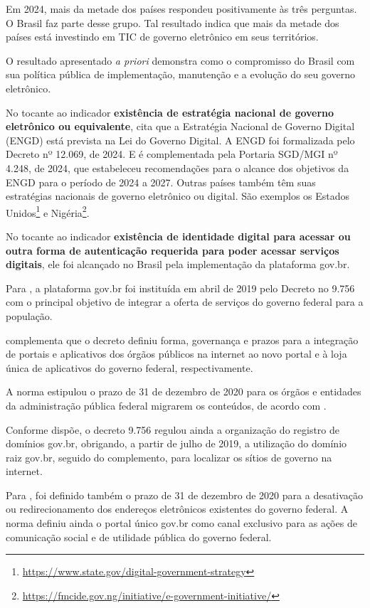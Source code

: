 Em 2024, mais da metade dos países respondeu positivamente às três perguntas. O Brasil faz parte desse grupo. Tal resultado indica que mais da metade dos países está investindo em TIC de governo eletrônico em seus territórios.

O resultado apresentado \textit{a priori} demonstra como o compromisso do Brasil com sua política pública de implementação, manutenção e a evolução do seu governo eletrônico.

No tocante ao indicador \textbf{existência de estratégia nacional de governo
eletrônico ou equivalente}, \cite{brasil_engd} cita que a Estratégia Nacional de Governo Digital (ENGD) está prevista na Lei do Governo Digital. A ENGD foi formalizada pelo Decreto nº 12.069, de 2024. E é complementada pela Portaria SGD/MGI nº 4.248, de 2024, que estabeleceu recomendações para o alcance dos objetivos da ENGD para o período de 2024 a 2027. Outras países também têm suas estratégias nacionais de governo eletrônico ou digital. São exemplos os Estados Unidos\footnote{\url{https://www.state.gov/digital-government-strategy}} e Nigéria\footnote{\url{https://fmcide.gov.ng/initiative/e-government-initiative/}}.

No tocante ao indicador \textbf{existência de identidade digital para acessar
ou outra forma de autenticação requerida para poder acessar serviços digitais}, ele foi alcançado no Brasil pela implementação da plataforma gov.br. 

Para \cite{mitkiewicz2024transformaccao}, a plataforma gov.br foi instituída em abril de 2019 pelo Decreto no 9.756 com o principal objetivo de integrar a oferta de serviços do governo federal para a população. 

\cite{mitkiewicz2024transformaccao} complementa que o decreto definiu forma, governança e prazos para a integração de portais e aplicativos dos órgãos públicos na internet ao novo portal e à loja única de aplicativos do governo federal, respectivamente. 

A norma estipulou o prazo de 31 de dezembro de 2020 para os órgãos e entidades da administração pública federal migrarem os conteúdos, de acordo com \cite{mitkiewicz2024transformaccao}.

Conforme \cite{mitkiewicz2024transformaccao} dispõe, o decreto 9.756 regulou ainda a organização do registro de domínios gov.br, obrigando, a partir de julho de 2019, a utilização do domínio raiz gov.br, seguido do complemento, para localizar os sítios de governo na internet. 

Para \cite{mitkiewicz2024transformaccao}, foi definido também o prazo de 31 de dezembro de 2020 para a desativação ou redirecionamento dos endereços eletrônicos existentes do governo federal. A norma definiu ainda o portal único gov.br como canal exclusivo para as ações de comunicação social e de utilidade pública do governo federal.

